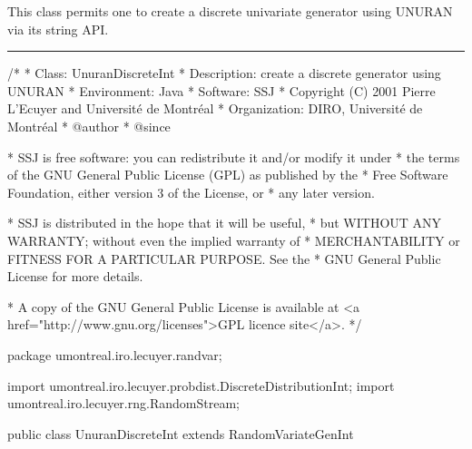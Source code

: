 
This class permits one to create a discrete univariate
generator using UNURAN via its string API.

\bigskip\hrule

\begin{code}
\begin{hide}
/*
 * Class:        UnuranDiscreteInt
 * Description:  create a discrete generator using UNURAN
 * Environment:  Java
 * Software:     SSJ 
 * Copyright (C) 2001  Pierre L'Ecuyer and Université de Montréal
 * Organization: DIRO, Université de Montréal
 * @author       
 * @since

 * SSJ is free software: you can redistribute it and/or modify it under
 * the terms of the GNU General Public License (GPL) as published by the
 * Free Software Foundation, either version 3 of the License, or
 * any later version.

 * SSJ is distributed in the hope that it will be useful,
 * but WITHOUT ANY WARRANTY; without even the implied warranty of
 * MERCHANTABILITY or FITNESS FOR A PARTICULAR PURPOSE.  See the
 * GNU General Public License for more details.

 * A copy of the GNU General Public License is available at
   <a href="http://www.gnu.org/licenses">GPL licence site</a>.
 */
\end{hide}
package umontreal.iro.lecuyer.randvar;\begin{hide}
import umontreal.iro.lecuyer.probdist.DiscreteDistributionInt;
import umontreal.iro.lecuyer.rng.RandomStream;
\end{hide}

public class UnuranDiscreteInt extends RandomVariateGenInt\begin{hide} {

   private RandUnuran unuran = new RandUnuran();
\end{hide}\end{code}

